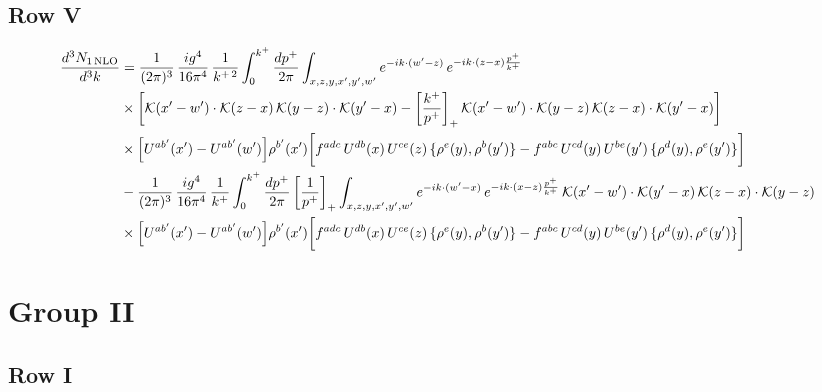 \documentclass[9pt]{article}
\numberwithin{equation}{section}
\begin{document}
\subsection{Row V}
\begin{align}
\frac{d^{3}N_{1\,\rm NLO}}{d^{3}k} & =\frac{1}{(2\pi)^{3}}\,\frac{ig^{4}}{16\pi^{4}}\,\frac{1}{k^{+\,2}}\int_{0}^{k^{+}}\frac{dp^{+}}{2\pi}\int_{x,z,y,x',y',w'}e^{-ik\cdot(w'-z)}\,e^{-ik\cdot(z-x)\frac{p^{+}}{k^{+}}}\notag\\
&\times\bigg[\mathcal{K}(x'-w')\cdot\mathcal{K}(z-x)\,\mathcal{K}(y-z)\cdot\mathcal{K}(y'-x)-\left[\frac{k^{+}}{p^{+}}\right]_{+}\mathcal{K}(x'-w')\cdot\mathcal{K}(y-z)\,\mathcal{K}(z-x)\cdot\mathcal{K}(y'-x)\bigg]\notag\\
&\times\Big[U^{ab'}(x')-U^{ab'}(w')\Big]\rho^{b'}(x')\bigg[f^{adc}\,U^{db}(x)\,U^{ce}(z)\,\{\rho^{e}(y),\rho^{b}(y')\}-f^{abc}\,U^{cd}(y)\,U^{be}(y')\,\{\rho^{d}(y),\rho^{e}(y')\}\bigg]\notag\\
&-\frac{1}{(2\pi)^{3}}\,\frac{ig^{4}}{16\pi^{4}}\,\frac{1}{k^{+}}\int_{0}^{k^{+}}\frac{dp^{+}}{2\pi}\left[\frac{1}{p^{+}}\right]_{+}\int_{x,z,y,x',y',w'}e^{-ik\cdot(w'-x)}\,e^{-ik\cdot(x-z)\frac{p^{+}}{k^{+}}}\,\mathcal{K}(x'-w')\cdot\mathcal{K}(y'-x)\,\mathcal{K}(z-x)\cdot\mathcal{K}(y-z)\notag\\
&\times\Big[U^{ab'}(x')-U^{ab'}(w')\Big]\rho^{b'}(x')\bigg[f^{adc}\,U^{db}(x)\,U^{ce}(z)\,\{\rho^{e}(y),\rho^{b}(y')\}-f^{abc}\,U^{cd}(y)\,U^{be}(y')\,\{\rho^{d}(y),\rho^{e}(y')\}\bigg]
\end{align}
\section{Group II}
\subsection{Row I}
\end{document}
